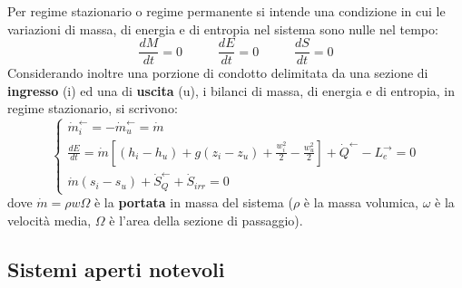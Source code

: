 Per regime stazionario o regime permanente si intende una condizione in cui le variazioni di massa, di energia e di entropia nel sistema sono nulle nel tempo:
\[
    \frac{dM}{dt} = 0 \;\;\;\;\;\;\;\;\;\; \frac{dE}{dt} = 0 \;\;\;\;\;\;\;\;\;\; \frac{dS}{dt} = 0
\]
Considerando inoltre una porzione di condotto delimitata da una sezione di \textbf{ingresso} (i) ed una di
\textbf{uscita} (u), i bilanci di massa, di energia e di entropia, in regime stazionario, si scrivono: 
\[
    \begin{cases}
        \dot{m}_i^\leftarrow = -\dot{m}_u^\leftarrow  = \dot{m}\\
        \frac{dE}{dt} = \dot{m}\left[ (h_i - h_u) + g(z_i-z_u) + \frac{w_i^2}{2} - \frac{w_u^2}{2}\right] + \dot{Q}^\leftarrow -L_e^\rightarrow = 0\\
        \dot{m}(s_i-s_u) + \dot{S}_Q^\leftarrow  + \dot{S}_{irr} = 0
    \end{cases}
\]
dove $\dot{m} = \rho w \Omega$ è la \textbf{portata} in massa del sistema ($\rho$ è la massa volumica, $\omega$ è la velocità media, $\Omega$ è l'area della sezione di passaggio).
\subsection{Sistemi aperti notevoli}
